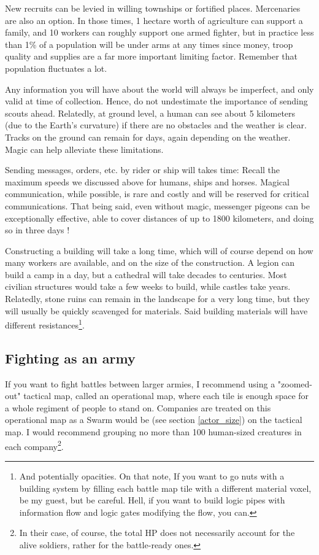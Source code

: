 New recruits can be levied in willing townships or fortified places. Mercenaries are also an option. In those times, 1 hectare worth of agriculture can support a family, and 10 workers can roughly support one armed fighter, but in practice less than 1\% of a population will be under arms at any times since money, troop quality and supplies are a far more important limiting factor. Remember that population fluctuates a lot.

Any information you will have about the world will always be imperfect, and only valid at time of collection. Hence, do not undestimate the importance of sending scouts ahead. Relatedly, at ground level, a human can see about 5 kilometers (due to the Earth's curvature) if there are no obstacles and the weather is clear. Tracks on the ground can remain for days, again depending on the weather. Magic can help alleviate these limitations. 

Sending messages, orders, etc. by rider or ship will takes time: Recall the maximum speeds we discussed above for humans, ships and horses. Magical communication, while possible, is rare and costly and will be reserved for critical communications. That being said, even without magic, messenger pigeons can be exceptionally effective, able to cover distances of up to 1800 kilometers, and doing so in three days !

Constructing a building will take a long time, which will of course depend on how many workers are available, and on the size of the construction. A legion can build a camp in a day, but a cathedral will take decades to centuries. Most civilian structures would take a few weeks to build, while castles take years. Relatedly, stone ruins can remain in the landscape for a very long time, but they will usually be quickly scavenged for materials. Said building materials will have different resistances\footnote{And potentially opacities. On that note, If you want to go nuts with a building system by filling each battle map tile with a different material voxel, be my guest, but be careful. Hell, if you want to build logic pipes with information flow and logic gates modifying the flow, you can.}.



\subsection{Fighting as an army}

If you want to fight battles between larger armies, I recommend using a "zoomed-out" tactical map, called an operational map, where each tile is enough space for a whole regiment of people to stand on. Companies are treated on this operational map as a Swarm would be (see section \ref{actor_size}) on the tactical map. I would recommend grouping no more than 100 human-sized creatures in each company\footnote{In their case, of course, the total HP does not necessarily account for the alive soldiers, rather for the battle-ready ones.}.

